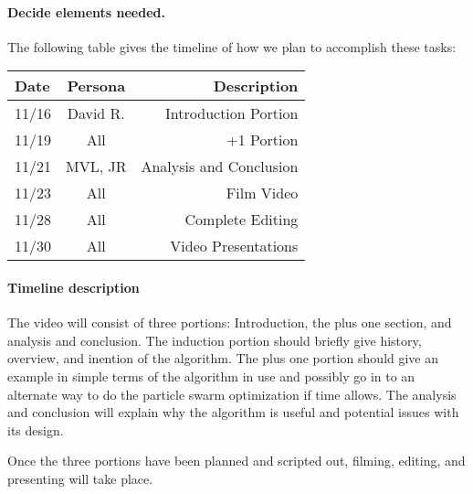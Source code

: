 \documentclass[11pt,twocolumn]{article}
\begin{document}
\paragraph{Decide elements needed.}  

The following table gives the timeline of how we plan to accomplish these tasks:

\begin{table}[h!]
\centering
\begin{tabular}{ |l | c | r|}
  \hline
  Date & Persona & Description \\
  \hline
  \hline
  11/16 & David R. & Introduction Portion \\
  \hline
  11/19 & All & +1 Portion \\
  \hline
  11/21 & MVL, JR & Analysis and Conclusion \\
  \hline
  11/23 & All & Film Video \\
  \hline
  11/28 & All & Complete Editing \\
  \hline
  11/30 & All & Video Presentations \\
  \hline
\end{tabular}
\end{table}

\paragraph{Timeline description}
The video will consist of three portions: Introduction, the plus one section, and analysis and conclusion. The induction portion should briefly give history, overview, and inention of the algorithm.  The plus one portion should give an example in simple terms of the algorithm in use and possibly go in to an alternate way to do the particle swarm optimization if time allows.  The analysis and conclusion will explain why the algorithm is useful and potential issues with its design.

Once the three portions have been planned and scripted out, filming, editing, and presenting will take place.
\end{document}
